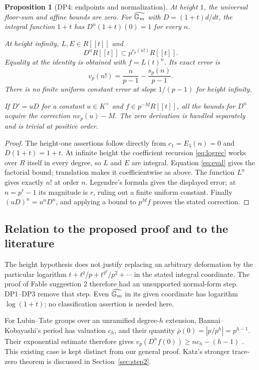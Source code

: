 \documentclass[11pt,a4paper]{article}
\newtheorem{proposition}[theorem]{Proposition}
\theoremstyle{definition}\newtheorem{remark}[theorem]{Remark}
\newcommand{\vp}{v_p}\newcommand{\dR}{\mathrm{dR}}\newcommand{\crys}{\mathrm{crys}}
\begin{document}
\begin{proposition}[DP4: endpoints and normalization]\label{DP4}
At height $1$, the universal floor-sum and affine bounds are zero. For $\widehat{\mathbb G_m}$ with $D=(1+t)d/dt$, the integral function $1+t$ has $D^n(1+t)(0)=1$ for every $n$.

At height infinity, $L,E\in R[[t]]$ and
\[
 D^nR[[t]]\subset p^{\vp(n!)}R[[t]].
\]
Equality at the identity is obtained with $f=L(t)^n$. Its exact error is
\[
 \vp(n!)=\frac{n}{p-1}-\frac{s_p(n)}{p-1}.
\]
There is no finite uniform constant error at slope $1/(p-1)$ for height infinity.

If $D'=uD$ for a constant $u\in K^\times$ and $f\in p^{-M}R[[t]]$, all the bounds for $D^n$ acquire the correction $n\vp(u)-M$. The zero derivation is handled separately and is trivial at positive order.
\end{proposition}
\begin{proof}
The height-one assertions follow directly from $c_1=E_1(n)=0$ and $D(1+t)=1+t$. At infinite height the coefficient recursion \eqref{eq:logrec} works over $R$ itself in every degree, so $L$ and $E$ are integral. Equation \eqref{eq:eval} gives the factorial bound; translation makes it coefficientwise as above. The function $L^n$ gives exactly $n!$ at order $n$. Legendre's formula gives the displayed error; at $n=p^r-1$ its magnitude is $r$, ruling out a finite uniform constant. Finally $(uD)^n=u^nD^n$, and applying a bound to $p^Mf$ proves the stated correction.
\end{proof}

\subsection{Relation to the proposed proof and to the literature}

The height hypothesis does not justify replacing an arbitrary deformation by the particular logarithm $t+t^q/p+t^{q^2}/p^2+\cdots$ in the stated integral coordinate. The proof of Fable suggestion 2 therefore had an unsupported normal-form step. DP1--DP3 remove that step. Even $\widehat{\mathbb G_m}$ in its given coordinate has logarithm $\log(1+t)$; no classification assertion is needed here.

For Lubin--Tate groups over an unramified degree-$h$ extension, Bannai--Kobayashi's period has valuation $c_h$, and their quantity $\overline\rho(0)=|p/p^h|=p^{h-1}$. Their exponential estimate therefore gives $\vp(D^nf(0))\ge nc_h-(h-1)$ \cite[\S2; Propositions 3.3, 3.5]{BK}. This existing case is kept distinct from our general proof. Katz's stronger trace-zero theorem is discussed in Section~\ref{sec:step2}.
\end{document}
